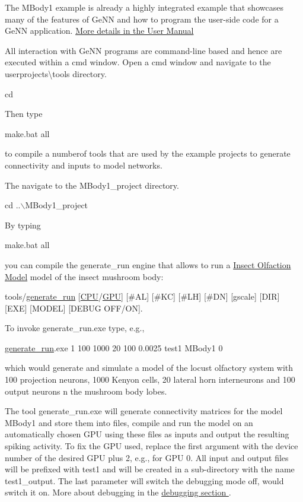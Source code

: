 The M\+Body1 example is already a highly integrated example that showcases many of the features of Ge\+N\+N and how to program the user-\/side code for a Ge\+N\+N application. \hyperlink{Manual}{More details in the User Manual }

All interaction with Ge\+N\+N programs are command-\/line based and hence are executed within a {\ttfamily cmd} window. Open a {\ttfamily cmd} window and navigate to the {\ttfamily userprojects\textbackslash{}tools} directory. 
\begin{DoxyCode}
cd %
\end{DoxyCode}
 Then type 
\begin{DoxyCode}
make.bat all
\end{DoxyCode}
 to compile a numberof tools that are used by the example projects to generate connectivity and inputs to model networks.

The navigate to the {\ttfamily M\+Body1\+\_\+project} directory. 
\begin{DoxyCode}
cd ..\(\backslash\)MBody1\_project
\end{DoxyCode}
 By typing 
\begin{DoxyCode}
make.bat all
\end{DoxyCode}
 you can compile the {\ttfamily generate\+\_\+run} engine that allows to run a \hyperlink{2_examples_ex_mbody}{Insect Olfaction Model} model of the insect mushroom body\+: 
\begin{DoxyCode}
tools/\hyperlink{userproject_2MBody__userdef__project_2README_8txt_a320a215d1e27b4de394be70e90d22863}{generate\_run} [\hyperlink{README_8txt_a74a069e3c75797de2636c4dd14daa147}{CPU}/\hyperlink{modelSpec_8h_a39cb9803524b6f3b783344b2f89867b4}{GPU}] [#AL] [#KC] [#LH] [#DN] [gscale] [DIR] [EXE] [MODEL] [DEBUG 
      OFF/ON]. 
\end{DoxyCode}
 To invoke {\ttfamily generate\+\_\+run.\+exe} type, e.\+g., 
\begin{DoxyCode}
\hyperlink{userproject_2MBody__userdef__project_2README_8txt_a320a215d1e27b4de394be70e90d22863}{generate\_run}.exe 1 100 1000 20 100 0.0025 test1 MBody1 0 
\end{DoxyCode}
 which would generate and simulate a model of the locust olfactory system with 100 projection neurons, 1000 Kenyon cells, 20 lateral horn interneurons and 100 output neurons n the mushroom body lobes.

The tool {\ttfamily generate\+\_\+run.\+exe} will generate connectivity matrices for the model {\ttfamily M\+Body1} and store them into files, compile and run the model on an automatically chosen G\+P\+U using these files as inputs and output the resulting spiking activity. To fix the G\+P\+U used, replace the first argument {} with the device number of the desired G\+P\+U plus 2, e.\+g., {} for G\+P\+U 0. All input and output files will be prefixed with {\ttfamily test1} and will be created in a sub-\/directory with the name {\ttfamily test1\+\_\+output}. The last parameter {} will switch the debugging mode off, {} would switch it on. More about debugging in the \hyperlink{}{debugging section }.

